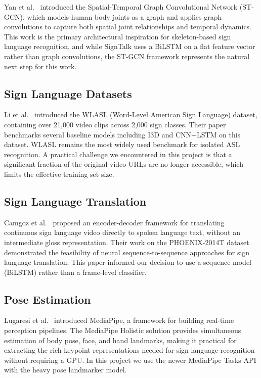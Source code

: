 \documentclass[conference]{IEEEtran}
\begin{document}
Yan et al.\ \cite{yan2018stgcn} introduced the Spatial-Temporal Graph Convolutional Network (ST-GCN), which models human body joints as a graph and applies graph convolutions to capture both spatial joint relationships and temporal dynamics. This work is the primary architectural inspiration for skeleton-based sign language recognition, and while SignTalk uses a BiLSTM on a flat feature vector rather than graph convolutions, the ST-GCN framework represents the natural next step for this work.

\subsection{Sign Language Datasets}

Li et al.\ \cite{li2020wlasl} introduced the WLASL (Word-Level American Sign Language) dataset, containing over 21,000 video clips across 2,000 sign classes. Their paper benchmarks several baseline models including I3D and CNN+LSTM on this dataset. WLASL remains the most widely used benchmark for isolated ASL recognition. A practical challenge we encountered in this project is that a significant fraction of the original video URLs are no longer accessible, which limits the effective training set size.

\subsection{Sign Language Translation}

Camgoz et al.\ \cite{camgoz2018slr} proposed an encoder-decoder framework for translating continuous sign language video directly to spoken language text, without an intermediate gloss representation. Their work on the PHOENIX-2014T dataset demonstrated the feasibility of neural sequence-to-sequence approaches for sign language translation. This paper informed our decision to use a sequence model (BiLSTM) rather than a frame-level classifier.

\subsection{Pose Estimation}

Lugaresi et al.\ \cite{lugaresi2019mediapipe} introduced MediaPipe, a framework for building real-time perception pipelines. The MediaPipe Holistic solution provides simultaneous estimation of body pose, face, and hand landmarks, making it practical for extracting the rich keypoint representations needed for sign language recognition without requiring a GPU. In this project we use the newer MediaPipe Tasks API with the heavy pose landmarker model.
\end{document}
